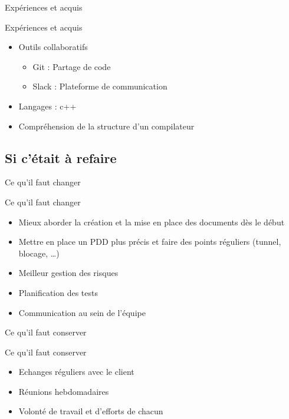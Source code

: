 	    \begin{frame}{Expériences et acquis}
	    	\begin{block}{Expériences et acquis}
	    		\begin{itemize}
					\item<1-> Outils collaboratifs
					\begin{itemize}
						\item<2-> Git : Partage de code 
						\item<3-> Slack : Plateforme de communication
					\end{itemize}
					\item<4-> Langages : c++
					\item<5-> Compréhension de la structure d’un compilateur

	    		\end{itemize}
	    	\end{block}
	    \end{frame}

	\subsection{Si c'était à refaire}

	    \begin{frame}{Ce qu’il faut changer}
	    	\begin{block}{Ce qu’il faut changer}
	    		\begin{itemize}
	    			\item<1-> Mieux aborder la création et la mise en place des documents dès le début
					\item<2-> Mettre en place un PDD plus précis et faire des points réguliers (tunnel, blocage, …) 
					\item<3-> Meilleur gestion des risques 
					\item<4-> Planification des tests
					\item<5-> Communication au sein de l’équipe

	    		\end{itemize}
	    	\end{block}
	    \end{frame}

	    \begin{frame}{Ce qu’il faut conserver}
	    	\begin{block}{Ce qu’il faut conserver}
	    		\begin{itemize}
	    			\item<1-> Echanges réguliers avec le client
					\item<2-> Réunions hebdomadaires
					\item<3-> Volonté de travail et d’efforts de chacun
	    		\end{itemize}
	    	\end{block}
	    \end{frame}